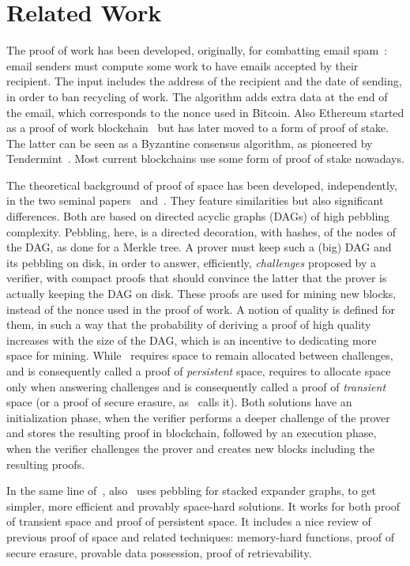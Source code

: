 \section{Related Work}\label{sec:related_work}

The proof of work has been developed, originally, for combatting email spam~\cite{DworkN92}:
email senders must compute some
work to have emails accepted by their recipient. The input includes
the address of the recipient and the date of sending, in order to ban
recycling of work. The algorithm adds extra data at the end of the email,
which corresponds to the nonce used in Bitcoin.
Also Ethereum started as a proof of work blockchain~\cite{AntonopoulosW18} but has later
moved to a form of proof of stake. The latter can be seen as a
Byzantine consensus algorithm, as pioneered by Tendermint~\cite{Kwon14}.
Most current blockchains use some form of proof of stake nowadays.

The theoretical background of proof of space has been developed, independently,
in the two seminal papers~\cite{AtenieseBFG14} and~\cite{DziembowskiFKP15}.
They feature similarities but also significant differences. Both are based
on directed acyclic graphs (DAGs) of high pebbling complexity.
Pebbling, here, is a directed decoration, with hashes, of the nodes of the DAG, as done for
a Merkle tree.
A prover must keep such a (big) DAG and its pebbling on disk, in order to answer, efficiently,
\emph{challenges} proposed by a verifier, with compact proofs that should convince the latter that
the prover is actually keeping the DAG on disk. These proofs are used for mining new blocks,
instead of the nonce used in the proof of work. A notion of quality is defined for
them, in such a way that the probability of deriving a proof of high quality increases
with the size of the DAG, which is an incentive to dedicating more space for mining.
While~\cite{DziembowskiFKP15} requires space to remain allocated between challenges,
and is consequently called a proof of \emph{persistent} space, \cite{AtenieseBFG14} requires
to allocate space only when answering challenges and is consequently called
a proof of \emph{transient} space (or a proof of secure erasure, as~\cite{DziembowskiFKP15} calls it).
Both solutions have an initialization phase, when the verifier performs a deeper challenge
of the prover and stores the resulting proof in blockchain, followed by an execution phase,
when the verifier challenges the prover and creates new blocks including the resulting proofs.

In the same line of~\cite{AtenieseBFG14,DziembowskiFKP15}, also~\cite{RenD16} uses
pebbling for stacked expander graphs, to get simpler, more efficient and
provably space-hard solutions.
It works for both proof of transient space and proof of persistent space.
It includes a nice review of previous proof of space
and related techniques: memory-hard functions, proof of secure erasure, provable data possession,
proof of retrievability.

